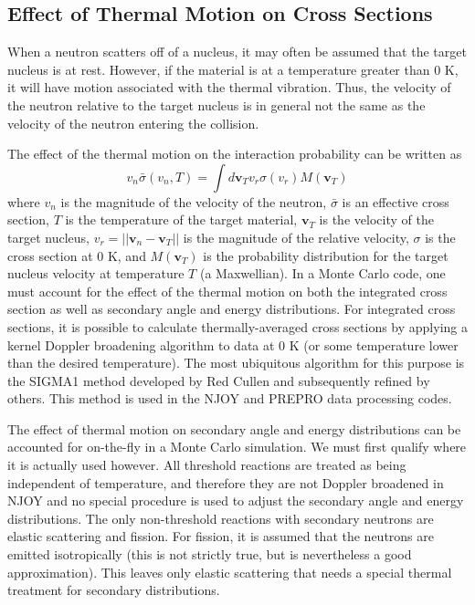 \subsection{Effect of Thermal Motion on Cross Sections}
\label{sec:freegas}

When a neutron scatters off of a nucleus, it may often be assumed that the
target nucleus is at rest. However, if the material is at a temperature greater
than 0 K, it will have motion associated with the thermal vibration. Thus, the
velocity of the neutron relative to the target nucleus is in general not the
same as the velocity of the neutron entering the collision.

The effect of the thermal motion on the interaction probability can be written
as
\begin{equation}
  \label{eq:doppler-broaden}
  v_n \bar{\sigma} (v_n, T) = \int d\mathbf{v}_T v_r \sigma(v_r)
  M (\mathbf{v}_T)
\end{equation}
where $v_n$ is the magnitude of the velocity of the neutron, $\bar{\sigma}$ is
an effective cross section, $T$ is the temperature of the target material,
$\mathbf{v}_T$ is the velocity of the target nucleus, $v_r = || \mathbf{v}_n -
\mathbf{v}_T ||$ is the magnitude of the relative velocity, $\sigma$ is the
cross section at 0 K, and $M (\mathbf{v}_T)$ is the probability distribution for
the target nucleus velocity at temperature $T$ (a Maxwellian). In a Monte Carlo
code, one must account for the effect of the thermal motion on both the
integrated cross section as well as secondary angle and energy
distributions. For integrated cross sections, it is possible to calculate
thermally-averaged cross sections by applying a kernel Doppler broadening
algorithm to data at 0 K (or some temperature lower than the desired
temperature). The most ubiquitous algorithm for this purpose is the SIGMA1
method \cite{nse-cullen-1976} developed by Red Cullen and subsequently refined
by others. This method is used in the NJOY \cite{nds-macfarlane-2010} and PREPRO
\cite{iaea-cullen-2012} data processing codes.

The effect of thermal motion on secondary angle and energy distributions can be
accounted for on-the-fly in a Monte Carlo simulation. We must first qualify
where it is actually used however. All threshold reactions are treated as being
independent of temperature, and therefore they are not Doppler broadened in NJOY
and no special procedure is used to adjust the secondary angle and energy
distributions. The only non-threshold reactions with secondary neutrons are
elastic scattering and fission. For fission, it is assumed that the neutrons are
emitted isotropically (this is not strictly true, but is nevertheless a good
approximation). This leaves only elastic scattering that needs a special thermal
treatment for secondary distributions.

